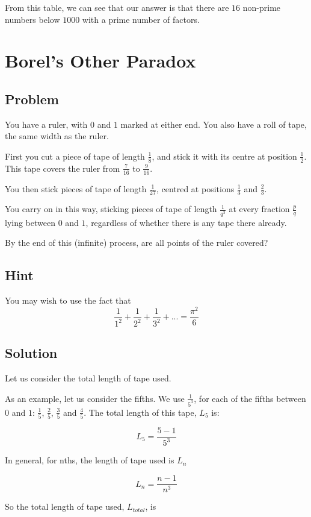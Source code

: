 \documentclass{book}
\begin{document}
From this table, we can see that our answer is that there are \(\boxed{16}\) non-prime numbers below \(1000\) with a prime number of factors.
\newpage

\section{Borel's Other Paradox}
\subsection{Problem}
You have a ruler, with \(0\) and \(1\) marked at either end. You also have a roll of tape, the same width as the ruler.

First you cut a piece of tape of length \(\frac{1}{8}\), and stick it with its centre at position \(\frac{1}{2}\). This tape covers the ruler from \(\frac{7}{16}\) to \(\frac{9}{16}\).

You then stick pieces of tape of length \(\frac{1}{27}\), centred at positions \(\frac{1}{3}\) and \(\frac{2}{3}\).

You carry on in this way, sticking pieces of tape of length \(\frac{1}{q^3}\) at every fraction \(\frac{p}{q}\) lying between \(0\) and \(1\), regardless of whether there is any tape there already.

By the end of this (infinite) process, are all points of the ruler covered?

\subsection{Hint}
You may wish to use the fact that \[\frac{1}{1^2}+\frac{1}{2^2}+\frac{1}{3^2}+...=\frac{\pi^2}{6}\]
\subsection{Solution}
Let us consider the total length of tape used.

As an example, let us consider the fifths. We use \(\frac{1}{5^3}\), for each of the fifths between \(0\) and \(1\): \(\frac{1}{5}\), \(\frac{2}{5}\), \(\frac{3}{5}\) and \(\frac{4}{5}\). The total length of this tape, \(L_5\) is:

\[L_5=\frac{5-1}{5^3}\]

In general, for nths, the length of tape used is \(L_n\)

\[L_n=\frac{n-1}{n^3}\]

So the total length of tape used, \(L_{total}\), is
\end{document}
